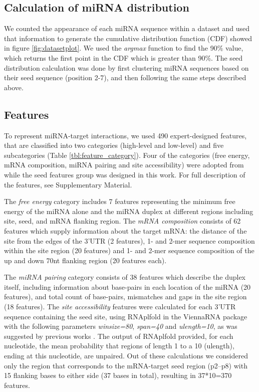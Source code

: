 \documentclass{bmcart}
\begin{document}
\subsection*{Calculation of miRNA distribution} \label{miRNAdistribution2}
We counted the appearance of each miRNA sequence within a dataset and used that information to generate the cumulative distribution function (CDF) showed in figure \ref{fig:datasetplot}. We used the \textit{argmax} function to find the 90\% value, which returns the first point in the CDF which is greater than 90\%. 
The seed distribution calculation was done by first clustering miRNA sequences based on their seed sequence (position 2-7), and then following the same steps described above.

\subsection*{Features} \label{methods_features}
To represent miRNA-target interactions, we used 490 expert-designed features, that are classified into two categories (high-level and low-level) and five subcategories (Table \ref{tbl:feature_category}). Four of the categories (free energy, mRNA composition, miRNA pairing and site accessibility) were adopted from \cite{wen2018deepmirtar} while the seed features group was designed in this work. For full description of the features, see Supplementary Material.

The \textit{free energy} category includes 7 features representing the minimum free energy of the miRNA alone and the miRNA duplex at different regions including site, seed, and mRNA flanking region. The \textit{mRNA composition} consists of 62 features which supply information about the target mRNA: the distance of the site from the edges of the 3'UTR (2 features), 1- and 2-mer sequence composition within the site region (20 features) and 1- and 2-mer sequence composition of the up and down 70nt flanking region (20 features each). 

The \textit{miRNA pairing} category consists of 38 features which describe the duplex itself, including information about base-pairs in each location of the miRNA (20 features), and total count of base-pairs, mismatches and gaps in the site region (18 features).
The \textit{site accessibility} features were calculated for each 3'UTR sequence containing the seed site, using RNAplfold in the ViennaRNA package \cite{lorenz2011viennarna} with the following parameters \textit{winsize=80}, \textit{span=40} and \textit{ulength=10}, as was suggested by previous works \cite{menor2014mirmark, wen2018deepmirtar}. The output of RNAplfold provided, for each nucleotide, the mean probability that regions of length 1 to a 10 (ulength), ending at this nucleotide, are unpaired. Out of these calculations we considered only the region that corresponds to the mRNA-target seed region (p2–p8) with 15 flanking bases to either side (37 bases in total), resulting in 37*10=370 features.
\end{document}
